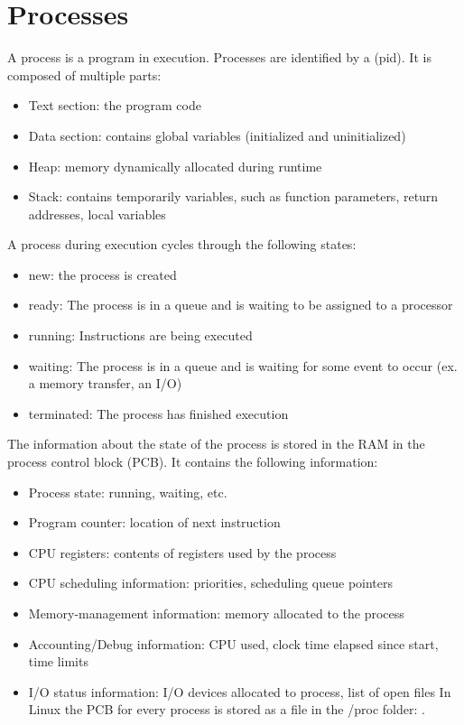 \chapter{Processes}

A process is a program in execution. Processes are identified by a  (pid). It is composed of multiple parts:

\begin{itemize}
  \item Text section: the program code
  \item Data section: contains global variables (initialized and uninitialized)
  \item Heap: memory dynamically allocated during runtime
  \item Stack: contains temporarily variables, such as function parameters, return addresses, local variables
\end{itemize}


A process during execution cycles through the following states:

\begin{itemize}
  \item new: the process is created
  \item ready: The process is in a queue and is waiting to be assigned to a processor
  \item running: Instructions are being executed
  \item waiting: The process is in a queue and is waiting for some event to occur (ex. a memory transfer, an I/O)
  \item terminated: The process has finished execution
\end{itemize}


The information about the state of the process is stored in the RAM in the process control block (PCB). It contains the following information:

\begin{itemize}
  \item Process state: running, waiting, etc.
  \item Program counter: location of next instruction
  \item CPU registers: contents of registers used by the process
  \item CPU scheduling information: priorities, scheduling queue pointers
  \item Memory-management information: memory allocated to the process
  \item Accounting/Debug information: CPU used, clock time elapsed since start, time limits
  \item I/O status information: I/O devices allocated to process, list of open files
  In Linux the PCB for every process is stored as a file in the /proc folder: .
\end{itemize}


